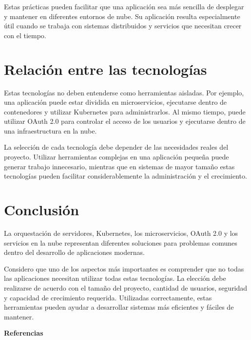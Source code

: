\documentclass[12pt,letterpaper]{article}
\begin{document}
Estas prácticas pueden facilitar que una aplicación sea más sencilla de desplegar y mantener en diferentes entornos de nube. Su aplicación resulta especialmente útil cuando se trabaja con sistemas distribuidos y servicios que necesitan crecer con el tiempo.

\section*{Relación entre las tecnologías}

Estas tecnologías no deben entenderse como herramientas aisladas. Por ejemplo, una aplicación puede estar dividida en microservicios, ejecutarse dentro de contenedores y utilizar Kubernetes para administrarlos. Al mismo tiempo, puede utilizar OAuth 2.0 para controlar el acceso de los usuarios y ejecutarse dentro de una infraestructura en la nube.

La selección de cada tecnología debe depender de las necesidades reales del proyecto. Utilizar herramientas complejas en una aplicación pequeña puede generar trabajo innecesario, mientras que en sistemas de mayor tamaño estas tecnologías pueden facilitar considerablemente la administración y el crecimiento.

\section*{Conclusión}

La orquestación de servidores, Kubernetes, los microservicios, OAuth 2.0 y los servicios en la nube representan diferentes soluciones para problemas comunes dentro del desarrollo de aplicaciones modernas.

Considero que uno de los aspectos más importantes es comprender que no todas las aplicaciones necesitan utilizar todas estas tecnologías. La elección debe realizarse de acuerdo con el tamaño del proyecto, cantidad de usuarios, seguridad y capacidad de crecimiento requerida. Utilizadas correctamente, estas herramientas pueden ayudar a desarrollar sistemas más eficientes y fáciles de mantener.


\newpage

\begin{center}
\textbf{Referencias}
\end{center}

\setlength{\parindent}{0cm}
\end{document}
